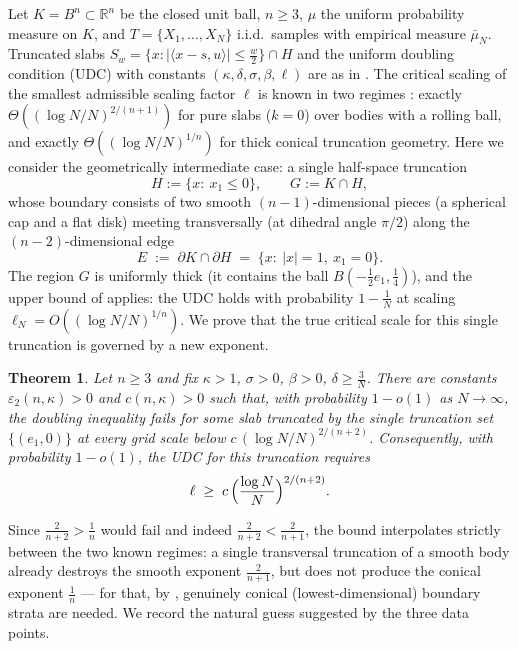 \documentclass[11pt]{article}
\newtheorem{theorem}{Theorem}[section]
\newcommand{\R}{\mathbb{R}}
\newcommand{\emp}{\bar\mu_N}
\begin{document}
Let $K=B^n\subset\R^n$ be the closed unit ball, $n\ge3$, $\mu$ the uniform
probability measure on $K$, and $T=\{X_1,\dots,X_N\}$ i.i.d.\ samples with
empirical measure $\emp$.  Truncated slabs
$S_w=\{x:|\langle x-s,u\rangle|\le\frac w2\}\cap H$ and the uniform doubling
condition (UDC) with constants $(\kappa,\delta,\sigma,\beta,\ell)$ are as in
\cite{ShmaloUDC,companion2}.  The critical scaling of the smallest admissible
scaling factor $\ell$ is known in two regimes
\cite{companion3,companion4,companion5}: exactly
$\Theta((\log N/N)^{2/(n+1)})$ for pure slabs ($k=0$) over bodies with a
rolling ball, and exactly $\Theta((\log N/N)^{1/n})$ for thick conical
truncation geometry.  Here we consider the geometrically intermediate case:
a single half-space truncation
\[
H:=\{x:\ x_1\le0\},
\qquad
G:=K\cap H,
\]
whose boundary consists of two smooth $(n-1)$-dimensional pieces (a spherical
cap and a flat disk) meeting transversally (at dihedral angle $\pi/2$) along
the $(n-2)$-dimensional edge
\[
E\;:=\;\partial K\cap\partial H\;=\;\{x:\ |x|=1,\ x_1=0\}.
\]
The region $G$ is uniformly thick (it contains the ball
$B(-\tfrac12e_1,\tfrac14)$), and the upper bound of \cite{companion2} applies:
the UDC holds with probability $1-\frac1N$ at scaling
$\ell_N=O((\log N/N)^{1/n})$.  We prove that the true critical scale for this
single truncation is governed by a new exponent.

\begin{theorem}\label{thm:main}
Let $n\ge3$ and fix $\kappa>1$, $\sigma>0$, $\beta>0$, $\delta\ge\frac3N$.
There are constants $\varepsilon_2(n,\kappa)>0$ and $c(n,\kappa)>0$ such that,
with probability $1-o(1)$ as $N\to\infty$, the doubling inequality fails for
some slab truncated by the single truncation set $\{(e_1,0)\}$ at every grid
scale below $c\,(\log N/N)^{2/(n+2)}$.  Consequently, with probability
$1-o(1)$, the UDC for this truncation requires
\[
\ell\;\ge\;c\,\Bigl(\frac{\log N}{N}\Bigr)^{2/(n+2)} .
\]
\end{theorem}

Since $\frac{2}{n+2}>\frac1n$ would fail and indeed
$\frac{2}{n+2}<\frac{2}{n+1}$, the bound interpolates strictly between the two
known regimes: a single transversal truncation of a smooth body already
destroys the smooth exponent $\frac{2}{n+1}$, but does not produce the conical
exponent $\frac1n$ --- for that, by \cite{companion3}, genuinely conical
(lowest-dimensional) boundary strata are needed.  We record the natural guess
suggested by the three data points.
\end{document}
